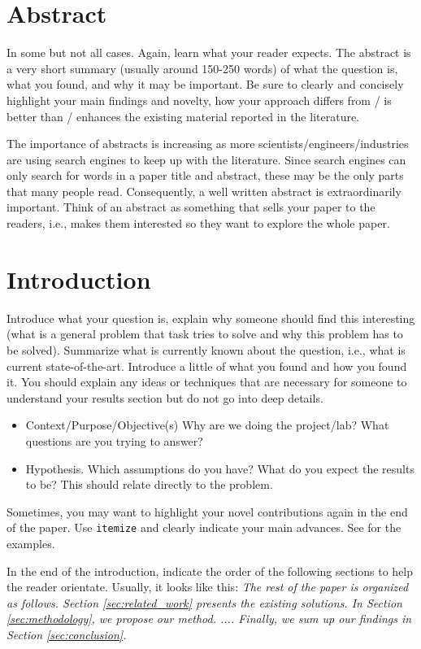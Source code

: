 \documentclass[10pt,conference,compsocconf]{IEEEtran}
\begin{document}
\section*{Abstract}
In some but not all cases. Again, learn what your reader expects. The abstract is a very short summary (usually around 150-250 words) of what the question is, what you found, and why it may be important. Be sure to clearly and concisely highlight your main findings and novelty, how your approach differs from / is better than / enhances the existing material reported in the literature.

The importance of abstracts is increasing as more scientists/engineers/industries are using search engines to keep up with the literature. Since search engines can only search for words in a paper title and abstract, these may be the only parts that many people read. Consequently, a well written abstract is extraordinarily important. Think of an abstract as something that sells your paper to the readers, i.e., makes them interested so they want to explore the whole paper.

\section{Introduction}\label{sec:introduction}

Introduce what your question is, explain why someone should find this interesting (what is a general problem that task tries to solve and why this problem has to be solved). Summarize what is currently known about the question, i.e., what is current state-of-the-art. Introduce a little of what you found and how you found it. You should explain any ideas or techniques that are necessary for someone to understand your results section but do not go into deep details.
\begin{itemize}
	\item Context/Purpose/Objective(s) Why are we doing the project/lab? What questions are you trying to answer?
	\item Hypothesis. Which assumptions do you have? What do you expect the results to be? This should relate directly to the problem.
\end{itemize}

Sometimes, you may want to highlight your novel contributions again in the end of the paper. Use \texttt{itemize} and clearly indicate your main advances. See \cite{pegg2023rtfs, huang2022you} for the examples.

In the end of the introduction, indicate the order of the following sections to help the reader orientate. Usually, it looks like this: \textit{The rest of the paper is organized as follows. Section \ref{sec:related_work} presents the existing solutions. In Section \ref{sec:methodology}, we propose our method. .... Finally, we sum up our findings in Section \ref{sec:conclusion}.}
\end{document}

